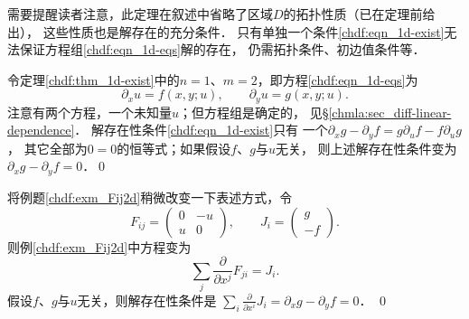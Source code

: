 需要提醒读者注意，此定理在叙述中省略了区域$D$的拓扑性质（已在定理前给出），
这些性质也是解存在的充分条件．
只有单独一个条件\eqref{chdf:eqn_1d-exist}无法保证方程组\eqref{chdf:eqn_1d-eqs}解的存在，
仍需拓扑条件、初边值条件等．

\begin{example}\label{chdf:exm_Fij2d}
    令定理\ref{chdf:thm_1d-exist}中的$n=1$、$m=2$，即方程\eqref{chdf:eqn_1d-eqs}为
    \begin{equation}
        \partial_x u = f(x,y;u),\qquad \partial_y u=g(x,y;u).
    \end{equation}
    注意有两个方程，一个未知量$u$；但方程组是确定的，
    见\S \ref{chmla:sec_diff-linear-dependence}．
    解存在性条件\eqref{chdf:eqn_1d-exist}只有
    一个$\partial_x g -\partial_y f = g \partial_u f-f \partial_u g $，
    其它全部为$0=0$的恒等式；如果假设$f$、$g$与$u$无关，
    则上述解存在性条件变为$\partial_x g -\partial_y f =0$．\qed
\end{example}

\begin{example}\label{chdf:exm_Fij2d-2}
    将例题\ref{chdf:exm_Fij2d}稍微改变一下表述方式，令
    \begin{equation}
        F_{ij}=\begin{pmatrix}
            0 & -u \\ u &0
        \end{pmatrix} ,\qquad
        J_{i}= \begin{pmatrix}
            g\\ -f
        \end{pmatrix}.
    \end{equation}
    则例\ref{chdf:exm_Fij2d}中方程变为
    \begin{equation}
        \sum_{j}\frac{\partial}{\partial x^j} F_{ji} = J_{i} .
    \end{equation}
    假设$f$、$g$与$u$无关，则解存在性条件是
    $\sum_{i}\frac{\partial}{\partial x^i}J_i= \partial_x g -\partial_y f =0 $．     \qed
\end{example}

